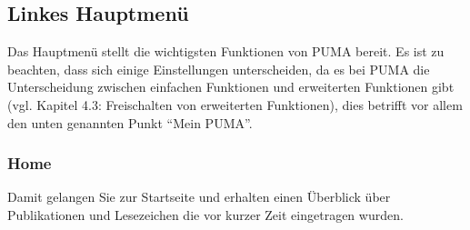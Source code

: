\documentclass[a4paper,11pt,twoside]{scrbook}
\begin{document}
\subsection{Linkes Hauptmenü}
Das Hauptmenü stellt die wichtigsten Funktionen von PUMA bereit. Es ist zu beachten, dass sich einige Einstellungen unterscheiden, da es bei PUMA die Unterscheidung zwischen einfachen Funktionen und erweiterten Funktionen gibt (vgl. Kapitel 4.3: Freischalten von erweiterten Funktionen), dies betrifft vor allem den unten genannten Punkt \enquote{Mein PUMA}. 
\subsubsection{Home}
Damit gelangen Sie zur Startseite und erhalten einen Überblick über Publikationen und Lesezeichen die vor kurzer Zeit eingetragen wurden.
\end{document}
